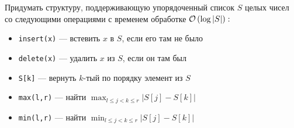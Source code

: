 \begin{task}[2]
Придумать структуру, поддерживающую упорядоченный список $S$ целых чисел со следующими операциями с временем обработке $\mathcal{O}\left(\log{|S|}\right):$
\begin{itemize}
	\item \texttt{insert(x)} --- встевить $x$ в $S$, если его там не было
	\item \texttt{delete(x)} --- удалить $x$ из $S$, если он там был
	\item \texttt{S[k]} --- вернуть $k$-тый по порядку элемент из $S$
	\item \texttt{max(l,r)} --- найти $\max_{l \leqslant j < k \leqslant r}{|S[j]-S[k]|}$
	\item \texttt{min(l,r)} --- найти $\min_{l \leqslant j < k \leqslant r}{|S[j]-S[k]|}$
\end{itemize}
\end{task}
